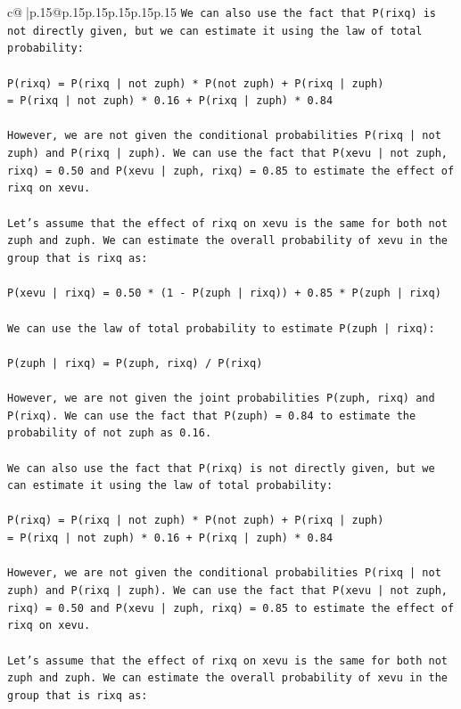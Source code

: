 \documentclass{article}
\begin{document}
{\begin{supertabular}{c@{$\;$}|p{.15\linewidth}@{}p{.15\linewidth}p{.15\linewidth}p{.15\linewidth}p{.15\linewidth}p{.15\linewidth}}
{{{\texttt{We can also use the fact that P(rixq) is not directly given, but we can estimate it using the law of total probability:} \\
\\ 
\texttt{P(rixq) = P(rixq | not zuph) * P(not zuph) + P(rixq | zuph)} \\
\texttt{= P(rixq | not zuph) * 0.16 + P(rixq | zuph) * 0.84} \\
\\ 
\texttt{However, we are not given the conditional probabilities P(rixq | not zuph) and P(rixq | zuph). We can use the fact that P(xevu | not zuph, rixq) = 0.50 and P(xevu | zuph, rixq) = 0.85 to estimate the effect of rixq on xevu.} \\
\\ 
\texttt{Let's assume that the effect of rixq on xevu is the same for both not zuph and zuph. We can estimate the overall probability of xevu in the group that is rixq as:} \\
\\ 
\texttt{P(xevu | rixq) = 0.50 * (1 {-} P(zuph | rixq)) + 0.85 * P(zuph | rixq)} \\
\\ 
\texttt{We can use the law of total probability to estimate P(zuph | rixq):} \\
\\ 
\texttt{P(zuph | rixq) = P(zuph, rixq) / P(rixq)} \\
\\ 
\texttt{However, we are not given the joint probabilities P(zuph, rixq) and P(rixq). We can use the fact that P(zuph) = 0.84 to estimate the probability of not zuph as 0.16.} \\
\\ 
\texttt{We can also use the fact that P(rixq) is not directly given, but we can estimate it using the law of total probability:} \\
\\ 
\texttt{P(rixq) = P(rixq | not zuph) * P(not zuph) + P(rixq | zuph)} \\
\texttt{= P(rixq | not zuph) * 0.16 + P(rixq | zuph) * 0.84} \\
\\ 
\texttt{However, we are not given the conditional probabilities P(rixq | not zuph) and P(rixq | zuph). We can use the fact that P(xevu | not zuph, rixq) = 0.50 and P(xevu | zuph, rixq) = 0.85 to estimate the effect of rixq on xevu.} \\
\\ 
\texttt{Let's assume that the effect of rixq on xevu is the same for both not zuph and zuph. We can estimate the overall probability of xevu in the group that is rixq as:} \\
}}}
\end{supertabular}}
\end{document}
